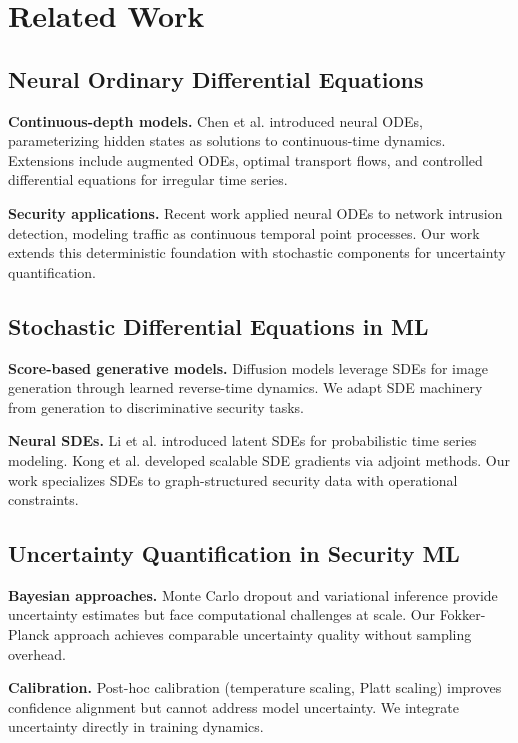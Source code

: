 \documentclass{article}
\begin{document}
\section{Related Work}

\subsection{Neural Ordinary Differential Equations}

\textbf{Continuous-depth models.} Chen et al. introduced neural ODEs, parameterizing hidden states as solutions to continuous-time dynamics. Extensions include augmented ODEs, optimal transport flows, and controlled differential equations for irregular time series.

\textbf{Security applications.} Recent work applied neural ODEs to network intrusion detection, modeling traffic as continuous temporal point processes. Our work extends this deterministic foundation with stochastic components for uncertainty quantification.

\subsection{Stochastic Differential Equations in ML}

\textbf{Score-based generative models.} Diffusion models leverage SDEs for image generation through learned reverse-time dynamics. We adapt SDE machinery from generation to discriminative security tasks.

\textbf{Neural SDEs.} Li et al. introduced latent SDEs for probabilistic time series modeling. Kong et al. developed scalable SDE gradients via adjoint methods. Our work specializes SDEs to graph-structured security data with operational constraints.

\subsection{Uncertainty Quantification in Security ML}

\textbf{Bayesian approaches.} Monte Carlo dropout and variational inference provide uncertainty estimates but face computational challenges at scale. Our Fokker-Planck approach achieves comparable uncertainty quality without sampling overhead.

\textbf{Calibration.} Post-hoc calibration (temperature scaling, Platt scaling) improves confidence alignment but cannot address model uncertainty. We integrate uncertainty directly in training dynamics.
\end{document}
